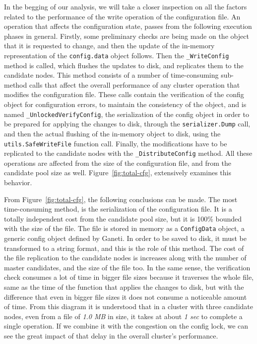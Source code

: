 In the begging of our analysis, we will take a closer inspection on all the
factors related to the performance of the write operation of the
configuration file. An operation that affects the configuration state, passes
from the following execution phases in general. Firstly, some preliminary checks
are being made on the object that it is requested to change, and then the
update of the in-memory representation of the \texttt{config.data} object
follows. Then the \texttt{\_WriteConfig} method is called, which flushes the
updates to disk, and replicates them to the candidate nodes. This method
consists of a number
of time-consuming sub-method calls that affect the overall performance of any
cluster operation that modifies the configuration file. These calls contain the
verification of the config object for configuration errors, to maintain the
consistency of the object, and is named \texttt{\_UnlockedVerifyConfig}, the
serialization of the config object in order to be prepared for applying the
changes to disk, through the \texttt{serializer.Dump} call, and then the actual
flushing of the in-memory object to disk, using the \texttt{utils.SafeWriteFile}
function call. Finally, the modifications have to be replicated to the candidate
nodes with the \texttt{\_DistributeConfig} method. All these operations are
affected from the size of the configuration file, and from the candidate pool
size as well. Figure~\ref{fig:total-cfg}, extensively examines this behavior.

From Figure~\ref{fig:total-cfg}, the following conclusions can be made. The most
time-consuming method, is the serialization of the configuration file. It
is a totally independent cost from the candidate pool size, but it is 100\%
bounded with the size of the file. The file is stored in
memory as a \texttt{ConfigData} object, a generic config object defined by
Ganeti. In order to be saved to disk, it must be transformed to a string format,
and this is the role of this method. The cost of the file replication to the
candidate nodes is increases along with the number of master candidates, and the
size of the file too. In the same sense, the verification check consumes a lot
of time in bigger file sizes because it traverses the whole file, same as the
time of the function that applies the changes to disk, but with the difference
that even in bigger file sizes it
does not consume a noticeable amount of time. From this diagram it is understood
that in a cluster with three candidate nodes, even from a file of \emph{1.0 MB}
in size, it takes at about \emph{1 sec} to complete a single operation.
If we combine it with the congestion on the config lock, we can see
the great impact of that delay in the overall cluster's performance.


